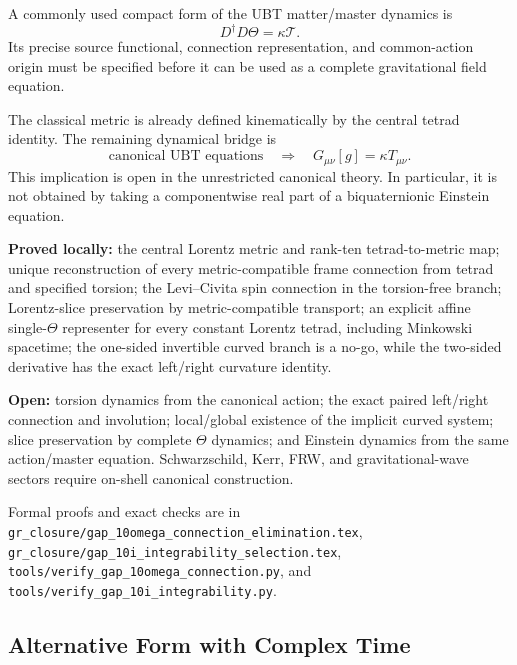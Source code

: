 \documentclass[12pt,a4paper]{article}
\begin{document}
A commonly used compact form of the UBT matter/master dynamics is
\begin{equation}
 \label{eq:canonical:theta_master}
 D^\dagger D\Theta=\kappa\mathcal T.
\end{equation}
Its precise source functional, connection representation, and common-action
origin must be specified before it can be used as a complete gravitational
field equation.

The classical metric is already defined kinematically by the central tetrad
identity.  The remaining dynamical bridge is
\[
 \text{canonical UBT equations}
 \quad\Longrightarrow\quad
 G_{\mu\nu}[g]=\kappa T_{\mu\nu}.
\]
This implication is open in the unrestricted canonical theory.  In particular,
it is not obtained by taking a componentwise real part of a biquaternionic
Einstein equation.

\begin{tcolorbox}[colback=yellow!7!white,colframe=orange!70!black,title=Current GR status]
\textbf{Proved locally:} the central Lorentz metric and rank-ten
 tetrad-to-metric map; unique reconstruction of every metric-compatible frame
 connection from tetrad and specified torsion; the Levi--Civita spin connection
 in the torsion-free branch; Lorentz-slice preservation by metric-compatible
 transport; an explicit affine single-$\Theta$ representer for every constant
 Lorentz tetrad, including Minkowski spacetime; the one-sided invertible curved
 branch is a no-go, while the two-sided derivative has the exact left/right
 curvature identity.

\textbf{Open:} torsion dynamics from the canonical action; the exact paired
 left/right connection and involution; local/global existence of the implicit
 curved system; slice preservation by complete $\Theta$ dynamics; and Einstein
 dynamics from the same action/master equation.  Schwarzschild, Kerr, FRW, and
 gravitational-wave sectors require on-shell canonical construction.
\end{tcolorbox}

Formal proofs and exact checks are in
\texttt{gr\_closure/gap\_10omega\_connection\_elimination.tex},
\texttt{gr\_closure/gap\_10i\_integrability\_selection.tex},
\texttt{tools/verify\_gap\_10omega\_connection.py}, and
\texttt{tools/verify\_gap\_10i\_integrability.py}.

\subsection{Alternative Form with Complex Time}
\end{document}
